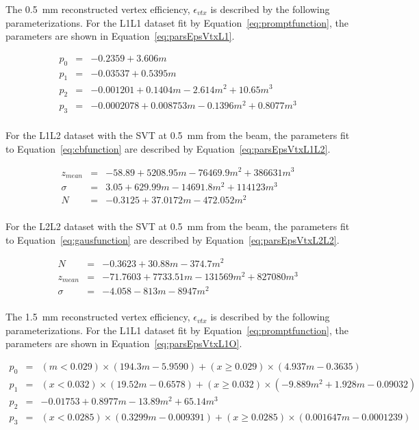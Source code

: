 The 0.5~mm reconstructed vertex efficiency, $\epsilon_{vtx}$ is described by the following parameterizations. For the L1L1 dataset fit by Equation~\eqref{eq:promptfunction}, the parameters are shown in Equation~\ref{eq:parsEpsVtxL1}.

\begin{eqnarray*}
\label{eq:parsEpsVtxL1}
p_0 & = & -0.2359+3.606m\\
p_1 & = & -0.03537+0.5395m \\
p_2 & = & -0.001201+0.1404m-2.614m^2+10.65m^3 \\
p_3 & = & -0.0002078+0.008753m-0.1396m^2+0.8077m^3\\
\end{eqnarray*}

For the L1L2 dataset with the SVT at 0.5~mm from the beam, the parameters fit to Equation~\eqref{eq:cbfunction} are described by Equation~\eqref{eq:parsEpsVtxL1L2}.

\begin{eqnarray*}
\label{eq:parsEpsVtxL1L2}
z_{mean} & = & -58.89+5208.95m-76469.9m^2+386631m^3\\
\sigma & = & 3.05+629.99m-14691.8m^2+114123m^3\\
N & = & -0.3125+37.0172m-472.052m^2 \\
\end{eqnarray*}

For the L2L2 dataset with the SVT at 0.5~mm from the beam, the parameters fit to Equation~\eqref{eq:gausfunction} are described by Equation~\eqref{eq:parsEpsVtxL2L2}.

\begin{eqnarray*}
\label{eq:parsEpsVtxL2L2}
N & = & -0.3623+30.88m-374.7m^2\\
z_{mean} & = & -71.7603+7733.51m-131569m^2+827080m^3\\
\sigma & = & -4.058-813m-8947m^2\\
\end{eqnarray*}


The 1.5~mm reconstructed vertex efficiency, $\epsilon_{vtx}$ is described by the following parameterizations. For the L1L1 dataset fit by Equation~\eqref{eq:promptfunction}, the parameters are shown in Equation~\ref{eq:parsEpsVtxL1O}.

\begin{eqnarray*}
\label{eq:parsEpsVtxL1O}
p_0 & = & (m<0.029)\times(194.3m-5.9590)+(x\geq 0.029)\times(4.937m-0.3635)\\
p_1 & = & (x<0.032)\times(19.52m-0.6578)+(x\geq 0.032)\times(-9.889m^2+1.928m-0.09032)\\
p_2 & = & -0.01753+0.8977m-13.89m^2+65.14m^3 \\
p_3 & = & (x<0.0285)\times(0.3299m-0.009391)+(x\geq 0.0285)\times(0.001647m-0.0001239)\\
\end{eqnarray*}

